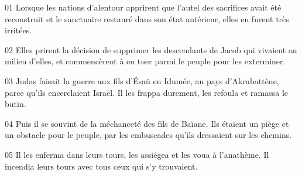 01 Lorsque les nations d’alentour apprirent que l’autel des sacrifices avait été reconstruit et le sanctuaire restauré dans son état antérieur, elles en furent très irritées.

02 Elles prirent la décision de supprimer les descendants de Jacob qui vivaient au milieu d’elles, et commencèrent à en tuer parmi le peuple pour les exterminer.

03 Judas faisait la guerre aux fils d’Ésaü en Idumée, au pays d’Akrabattène, parce qu’ils encerclaient Israël. Il les frappa durement, les refoula et ramassa le butin.

04 Puis il se souvint de la méchanceté des fils de Baïane. Ils étaient un piège et un obstacle pour le peuple, par les embuscades qu’ils dressaient sur les chemins.

05 Il les enferma dans leurs tours, les assiégea et les voua à l’anathème. Il incendia leurs tours avec tous ceux qui s’y trouvaient.
